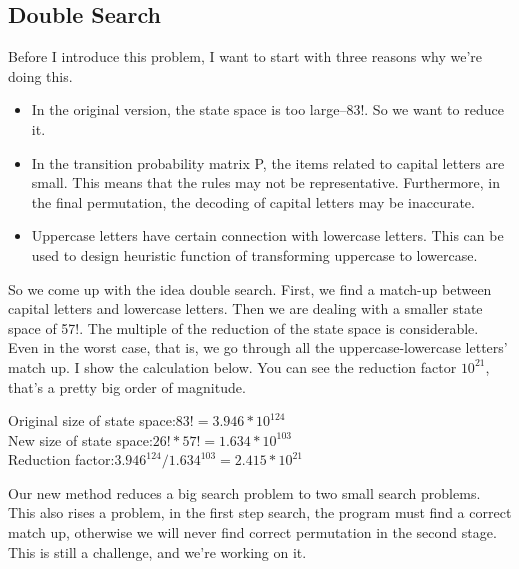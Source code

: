 \documentclass{acmtog} %
\begin{document}
\subsection{Double Search}
Before I introduce this problem, I want to start with three reasons why we're doing this.
\begin{itemize}
    \item In the original version, the state space is too large--83!. So we want to reduce it.
    \item In the transition probability matrix P, the items related to capital letters are small. This means that the rules may not be representative. Furthermore, in the final permutation, the decoding of capital letters may be inaccurate.
    \item Uppercase letters have certain connection with lowercase letters. This can be used to design heuristic function of transforming uppercase to lowercase.
\end{itemize}
So we come up with the idea double search. First, we find a match-up between  capital letters and lowercase letters. Then we are dealing with a smaller state space of 57!. The multiple of the reduction of the state space is considerable. Even in the worst case, that is, we go through all the uppercase-lowercase letters' match up. I show the calculation below. You can see the reduction factor $10^{21}$, that's a pretty big order of magnitude.
\begin{center}
    Original size of state space:$83!=3.946*10^{124}$\\
    New size of state space:$26!*57!=1.634*10^{103}$\\
    Reduction factor:$3.946^{124}/1.634^{103}=2.415*10^{21}$
    
\end{center}
Our new method reduces a big search problem to two small search problems. This also rises a problem, in the first step search, the program must find a correct match up, otherwise we will never find correct permutation in the second stage. This is still a challenge, and we're working on it.
\end{document}
